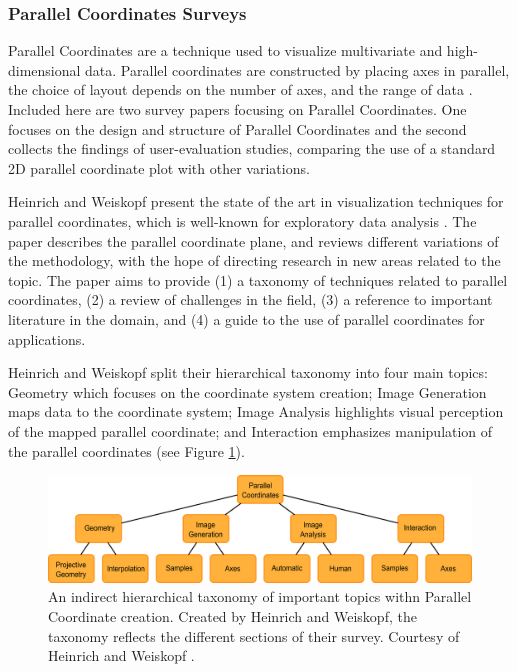 \subsubsection{Parallel Coordinates Surveys}
Parallel Coordinates are a technique used to visualize multivariate and high-dimensional data. Parallel coordinates are constructed by placing axes in parallel, the choice of layout depends on the number of axes, and the range of data \cite{heinrich2013state}. Included here are two survey papers focusing on Parallel Coordinates. One focuses on the design and structure of Parallel Coordinates and the second collects the findings of user-evaluation studies, comparing the use of a standard 2D parallel coordinate plot with other variations.


Heinrich and Weiskopf present the state of the art in visualization techniques for parallel coordinates, which is well-known for exploratory data analysis \cite{heinrich2013state}. The paper describes the parallel coordinate plane, and reviews different variations of the methodology, with the hope of directing research in new areas related to the topic.
The paper aims to provide (1) a taxonomy of techniques related to parallel coordinates, (2) a review of challenges in the field, (3) a reference to important literature in the domain, and (4) a guide to the use of parallel coordinates for applications.

Heinrich and Weiskopf split their hierarchical taxonomy into four main topics: Geometry which focuses on the coordinate system creation; Image Generation maps data to the coordinate system; Image Analysis highlights visual perception of the mapped parallel coordinate; and Interaction emphasizes manipulation of the parallel coordinates (see Figure \ref{fig: heinrich2013state}).

\begin{figure}[t]
\begin{center}
\includegraphics[width=1\textwidth]{images/heinrich2013stateFull}
\caption{An indirect hierarchical taxonomy of important topics withn Parallel Coordinate creation. Created by Heinrich and Weiskopf, the taxonomy reflects the different sections of their survey. Courtesy of Heinrich and Weiskopf \cite{heinrich2013state} .} \label{fig: heinrich2013state}
\end{center}
\end{figure}

